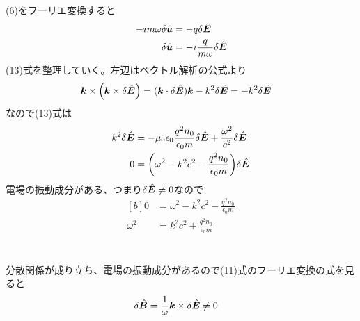 \documentclass[../ap_2009.tex]{subfiles}
\begin{document}
\section{}
(6)をフーリエ変換すると
\begin{equation}\begin{aligned}[b]
    -im\omega\delta\hat{\vb*{u}}&=-q\delta\hat{\vb*{E}}\\
    \delta\hat{\vb*{u}} &= -i\frac{q}{m\omega}\delta\hat{\vb*{E}}
\end{aligned}\end{equation}
(13)式を整理していく。左辺はベクトル解析の公式より
\begin{equation}\begin{aligned}[b]
    \vb*{k}\times\qty(\vb*{k}\times\delta\hat{\vb*{E}})
        &= (\vb*{k}\cdot\delta\hat{\vb*{E}})\vb*{k}-k^2\delta\hat{\vb*{E}}
        = -k^2\delta\hat{\vb*{E}}
\end{aligned}\end{equation}
なので(13)式は
\begin{equation}\begin{aligned}[b]
    k^2\delta\hat{\vb*{E}} &= -\mu_0\epsilon_0\frac{q^2n_0}{\epsilon_0 m}\delta\hat{\vb*{E}}+\frac{\omega^2}{c^2}\delta\hat{\vb*{E}}\\
    0 &= \qty(\omega^2-k^2c^2-\frac{q^2n_0}{\epsilon_0m})\delta\hat{\vb*{E}}
\end{aligned}\end{equation}
電場の振動成分がある、つまり\(\delta\hat{\vb*{E}}\neq0\)なので
\begin{equation}\begin{aligned}[b]
    0 &=\omega^2-k^2c^2-\frac{q^2n_0}{\epsilon_0m} \\
    \omega^2 &=k^2c^2+\frac{q^2n_0}{\epsilon_0m}
\end{aligned}\end{equation}

\section{}
分散関係が成り立ち、電場の振動成分があるので(11)式のフーリエ変換の式を見ると
\begin{equation}\begin{aligned}[b]
    \delta\hat{\vb*{B}} &= \frac{1}{\omega}\vb*{k}\times\delta\hat{\vb*{E}} \neq 0
\end{aligned}\end{equation}
\end{document}
